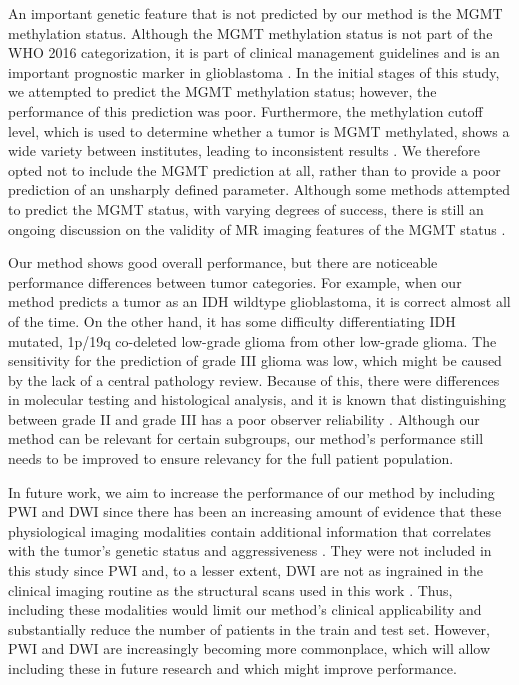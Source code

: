 An important genetic feature that is not predicted by our method is the \gls{MGMT} methylation status.
Although the \gls{MGMT} methylation status is not part of the \gls{WHO} 2016 categorization, it is part of clinical management guidelines and is an important prognostic marker in glioblastoma \autocite{louis20162016}.
In the initial stages of this study, we attempted to predict the \gls{MGMT} methylation status; however, the performance of this prediction was poor.
Furthermore, the methylation cutoff level, which is used to determine whether a tumor is \gls{MGMT} methylated, shows a wide variety between institutes, leading to inconsistent results  \autocite{malstrom2019MGMT}.
We therefore opted not to include the \gls{MGMT} prediction at all, rather than to provide a poor prediction of an unsharply defined parameter.
Although some methods attempted to predict the \gls{MGMT} status, with varying degrees of success, there is still an ongoing discussion on the validity of MR imaging features of the \gls{MGMT} status \autocite{tang2020multi, sasaki2019mgmt, gupta2013dwimgmt, carrillo2012mgmt, mikkelsen2020MGMT}.

Our method shows good overall performance, but there are noticeable performance differences between tumor categories.
For example, when our method predicts a tumor as an IDH wildtype glioblastoma, it is correct almost all of the time.
On the other hand, it has some difficulty differentiating IDH mutated, 1p/19q co-deleted low-grade glioma from other low-grade glioma.
The sensitivity for the prediction of grade III glioma was low, which might be caused by the lack of a central pathology review.
Because of this, there were differences in molecular testing and histological analysis, and it is known that distinguishing between grade II and grade III has a poor observer reliability \autocite{vandenbent2010interobserver}.
Although our method can be relevant for certain subgroups, our method's performance still needs to be improved to ensure relevancy for the full patient population.

In future work, we aim to increase the performance of our method by including \gls{PWI} and \gls{DWI} since there has been an increasing amount of evidence that these physiological imaging modalities contain additional information that correlates with the tumor's genetic status and aggressiveness \autocite{park2020radiomicspwi, kim2020diffusion}.
They were not included in this study since \gls{PWI} and, to a lesser extent, \gls{DWI} are not as ingrained in the clinical imaging routine as the structural scans used in this work \autocite{thust2018gliomaimaging, fresychlag2018imaging}.
Thus, including these modalities would limit our method's clinical applicability and substantially reduce the number of patients in the train and test set.
However, \gls{PWI} and \gls{DWI} are increasingly becoming more commonplace, which will allow including these in future research and which might improve performance.

